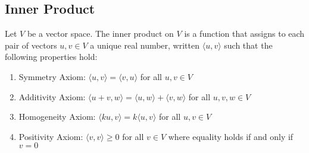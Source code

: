 \documentclass[12pt]{article}
\begin{document}
\subsection{Inner Product} 
\begin{definition} Let $V$ be a vector space. The inner product on $V$ is a function that assigns to each pair of vectors $u, v \in V$ a unique real number, written $\langle u, v\rangle$ such that the following properties hold: \begin{enumerate} \item Symmetry Axiom: $\langle u, v \rangle = \langle v, u \rangle$ for all $u, v \in V$ 
\item Additivity Axiom: $\langle u + v, w \rangle = \langle u, w \rangle + \langle v, w \rangle $ for all $u, v, w \in V$ 
\item Homogeneity Axiom: $\langle ku, v \rangle = k\langle u, v \rangle $ for all $u, v \in V$ 
\item Positivity Axiom: $\langle v, v \rangle \geq 0$ for all $v \in V$ where equality holds if and only if $v = 0$ \end{enumerate} \end{definition} 
\end{document}
